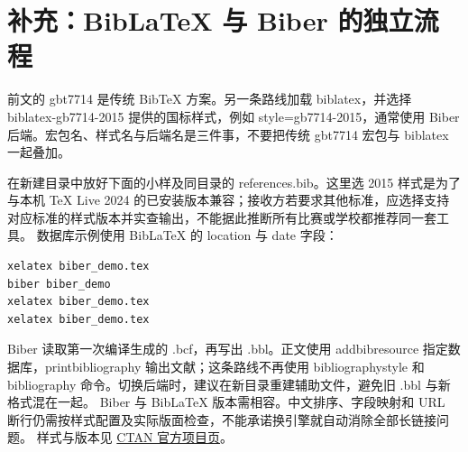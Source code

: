 \section{补充：BibLaTeX 与 Biber 的独立流程}\label{rev:latex:biber}
前文的 gbt7714 是传统 BibTeX 方案。另一条路线加载 biblatex，并选择 biblatex-gb7714-2015 提供的国标样式，例如 style=gb7714-2015，通常使用 Biber 后端。宏包名、样式名与后端名是三件事，不要把传统 gbt7714 宏包与 biblatex 一起叠加。

在新建目录中放好下面的小样及同目录的 references.bib。这里选 2015 样式是为了与本机 TeX Live 2024 的已安装版本兼容；接收方若要求其他标准，应选择支持对应标准的样式版本并实查输出，不能据此推断所有比赛或学校都推荐同一套工具。
数据库示例使用 BibLaTeX 的 location 与 date 字段：
\begingroup{}\endgroup
\begin{Verbatim}
xelatex biber_demo.tex
biber biber_demo
xelatex biber_demo.tex
xelatex biber_demo.tex
\end{Verbatim}
Biber 读取第一次编译生成的 .bcf，再写出 .bbl。正文使用 addbibresource 指定数据库，printbibliography 输出文献；这条路线不再使用 bibliographystyle 和 bibliography 命令。切换后端时，建议在新目录重建辅助文件，避免旧 .bbl 与新格式混在一起。
Biber 与 BibLaTeX 版本需相容。中文排序、字段映射和 URL 断行仍需按样式配置及实际版面检查，不能承诺换引擎就自动消除全部长链接问题。
样式与版本见 \href{https://ctan.org/pkg/biblatex-gb7714-2015}{CTAN 官方项目页}。
